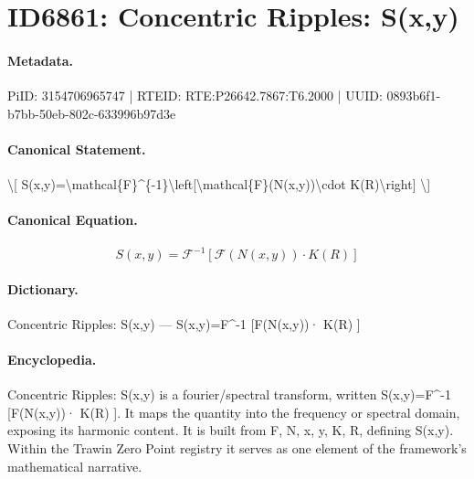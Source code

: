 \section*{ID6861: Concentric Ripples: S(x,y)}
\paragraph{Metadata.}
PiID: 3154706965747 | RTEID: RTE:P26642.7867:T6.2000 | UUID: 0893b6f1-b7bb-50eb-802c-633996b97d3e

\paragraph{Canonical Statement.}
\textbackslash{}[ S(x,y)=\textbackslash{}mathcal\{F\}\textasciicircum{}\{-1\}\textbackslash{}left[\textbackslash{}mathcal\{F\}(N(x,y))\textbackslash{}cdot K(R)\textbackslash{}right] \textbackslash{}]

\paragraph{Canonical Equation.}
\[
S(x,y)=\mathcal{F}^{-1}\left[\mathcal{F}(N(x,y))\cdot K(R)\right]
\]

\paragraph{Dictionary.}
Concentric Ripples: S(x,y) — S(x,y)=F\textasciicircum{}-1 [F(N(x,y))· K(R) ]

\paragraph{Encyclopedia.}
Concentric Ripples: S(x,y) is a fourier/spectral transform, written S(x,y)=F\textasciicircum{}-1 [F(N(x,y))· K(R) ]. It maps the quantity into the frequency or spectral domain, exposing its harmonic content. It is built from F, N, x, y, K, R, defining S(x,y). Within the Trawin Zero Point registry it serves as one element of the framework's mathematical narrative.
